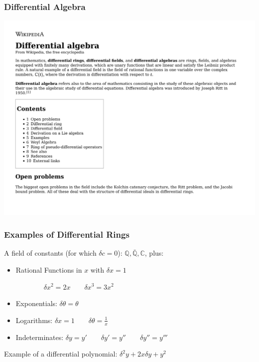 \documentclass{beamer}
\begin{document}
\begin{frame}
\frametitle{Differential Algebra}
\includegraphics[page=2, width=\textwidth]{Differential algebra - Wikipedia.pdf}
\end{frame}

\begin{frame}
\frametitle{Examples of Differential Rings}

A field of constants (for which $\delta c = 0$): $\mathbb{Q}, \mathbb{\bar{Q}}, \mathbb{C}$, plus:

\vskip 20pt
\begin{itemize}
\item Rational Functions in $x$ with $\delta x = 1$

$\qquad \qquad \delta x^2 = 2 x \qquad \delta x^3 = 3 x^2$

\item Exponentials: $\delta \theta = \theta$

\item Logarithms: $\delta x = 1 \qquad \delta \theta = \frac{1}{x}$

\item Indeterminates: $\delta y = y' \qquad \delta y' = y'' \qquad \delta y'' = y'''$
\end{itemize}

\vskip 20pt

Example of a differential polynomial: $\delta^2 y + 2 x \delta y + y^2$
\end{frame}
\end{document}
